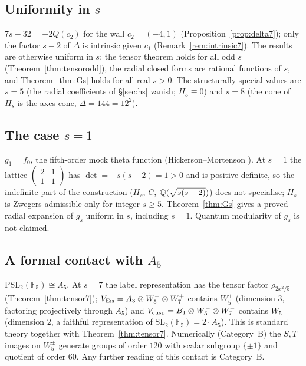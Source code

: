 \subsection{Uniformity in $s$}
\begin{proposition}[What depends on $s=7$]\label{prop:s7role8}
$7s-32=-2Q(c_2)$ for the wall $c_2=(-4,1)$ (Proposition~\ref{prop:delta7}); only the factor $s-2$ of $\Delta$ is intrinsic given $c_1$ (Remark~\ref{rem:intrinsic7}). The
results are otherwise uniform in $s$: the tensor theorem holds for all odd $s$ (Theorem~\ref{thm:tensorodd}), the radial closed forms are rational functions of $s$, and
Theorem~\ref{thm:Gs} holds for all real $s>0$. The structurally special values are $s=5$ (the radial coefficients of \S\ref{sec:hs} vanish; $H_5\equiv0$) and $s=8$
(the cone of $H_s$ is the axes cone, $\Delta=144=12^2$).
\end{proposition}

\subsection{The case $s=1$}
$g_1=f_0$, the fifth-order mock theta function (Hickerson--Mortenson \cite{HM}). At $s=1$ the lattice $\left(\begin{smallmatrix}2&1\\1&1\end{smallmatrix}\right)$ has
$\det=-s(s-2)=1>0$ and is positive definite, so the indefinite part of the construction ($H_s$, $C$, $\mathbb{Q}(\sqrt{s(s-2)})$) does not specialise; $H_s$ is
Zwegers-admissible only for integer $s\ge5$. Theorem~\ref{thm:Gs} gives a proved radial expansion of $g_s$ uniform in $s$, including $s=1$. Quantum modularity of
$g_s$ is not claimed.

\subsection{A formal contact with $A_5$}
$\mathrm{PSL}_2(\mathbb F_5)\cong A_5$. At $s=7$ the label representation has the tensor factor $\rho_{2x^2/5}$ (Theorem~\ref{thm:tensor7}); $V_{\rm Eis}=A_3\otimes
W_5^+\otimes W_7^+$ contains $W_5^+$ (dimension $3$, factoring projectively through $A_5$) and $V_{\rm cusp}=B_1\otimes W_5^-\otimes W_7^-$ contains $W_5^-$
(dimension $2$, a faithful representation of $\mathrm{SL}_2(\mathbb F_5)=2\cdot A_5$). This is standard theory together with Theorem~\ref{thm:tensor7}. Numerically
(Category~B) the $S,T$ images on $W_5^\pm$ generate groups of order $120$ with scalar subgroup $\{\pm1\}$ and quotient of order $60$. Any further reading of this
contact is Category~B.

